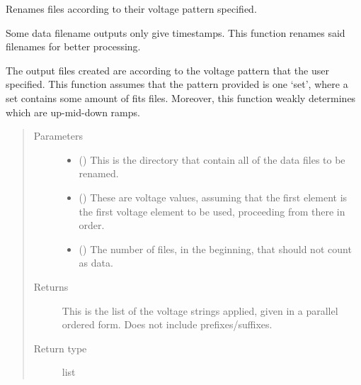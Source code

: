 \documentclass[letterpaper,10pt,english]{sphinxmanual}
\begin{document}

\begin{fulllineitems}
\label{\detokenize{python_docstrings/IfA_Smeargle.bravo.renaming:IfA_Smeargle.bravo.renaming.voltage_pattern_renaming}}
Renames files according to their voltage pattern specified.

Some data filename outputs only give timestamps. This function renames
said filenames for better processing.

The output files created are according to the voltage pattern that the
user specified. This function assumes that the pattern provided is one
‘set’, where a set contains some amount of fits files. Moreover, this
function weakly determines which are up-mid-down ramps.
\begin{quote}\begin{description}
\item[{Parameters}] \leavevmode\begin{itemize}
\item {} 
 () \textendash{} This is the directory that contain all of the data files to be
renamed.

\item {} 
 () \textendash{} These are voltage values, assuming that the first element is the
first voltage element to be used, proceeding from there in order.

\item {} 
 (\sphinxstyleliteralemphasis{\sphinxupquote{ (}}\sphinxstyleliteralemphasis{\sphinxupquote{)}}) \textendash{} The number of files, in the beginning, that should not count as data.

\end{itemize}

\item[{Returns}] \leavevmode
{} \textendash{} This is the list of the voltage strings applied, given in a parallel
ordered form. Does not include prefixes/suffixes.

\item[{Return type}] \leavevmode
list

\end{description}\end{quote}

\end{fulllineitems}
\end{document}

